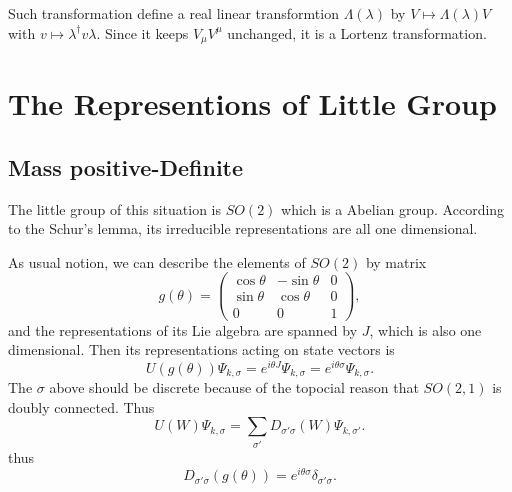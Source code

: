\documentclass[11pt]{article}
\begin{document}
Such transformation define a real linear transformtion $\Lambda(\lambda)$ by $V\mapsto \Lambda(\lambda)V$ with $v\mapsto  \lambda^\dag v \lambda$. Since it keeps $V_\mu V^\mu$ unchanged, it is a Lortenz transformation.

\section{The Representions of Little Group}
\subsection{Mass positive-Definite}
The little group of this situation is $SO\left(2\right)$ which is a Abelian group. According to the Schur's lemma, its irreducible representations are  all one dimensional.

As usual notion, we can describe the elements of $SO\left(2\right)$ by matrix
\begin{equation}
	g\left(\theta\right)=
	\begin{pmatrix}
		\cos \theta& -\sin \theta&0\\
		\sin \theta& \cos \theta&0\\
		0&0&1
	\end{pmatrix},
\end{equation}
and the representations of its Lie algebra are spanned by $J$, which is also one dimensional. Then its representations acting on state vectors is
\begin{equation}
	U(g(\theta))\Psi_{k,\sigma}=e^{i\theta J}\Psi_{k,\sigma}=e^{i\theta \sigma}\Psi_{k,\sigma}.
\end{equation}
The $\sigma$ above should be discrete because of the topocial reason that $SO(2,1)$ is doubly connected. Thus
\[
U(W)\Psi_{k,\sigma}=\sum_{\sigma'} D_{\sigma'\sigma}(W)\Psi_{k,\sigma'}.
\]
thus
\begin{equation}
	D_{\sigma'\sigma}\left(g\left(\theta\right)\right)=e^{i\theta \sigma}\delta_{\sigma'\sigma}.
\end{equation}
\end{document}
